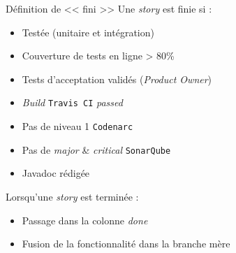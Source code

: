 \begin{frame}{Définition de << fini >>}
	Une \textit{story} est finie si : 
	\vspace{-10px}
	\begin{itemize}
		\item Testée (unitaire et intégration)
		\item Couverture de tests en ligne > 80\%
		\item Tests d'acceptation validés (\textit{Product Owner})
		\item \textit{Build} \texttt{Travis CI} \textit{passed}
		\item Pas de niveau 1 \texttt{Codenarc}
		\item Pas de \textit{major} \& \textit{critical} \texttt{SonarQube}
		\item Javadoc rédigée
	\end{itemize}
	\vfill
	\pause
	Lorsqu'une \textit{story} est terminée : 
	\vspace{-10px}
	\begin{itemize}
		\item Passage dans la colonne \textit{done}
		\item Fusion de la fonctionnalité dans la branche mère
	\end{itemize}





\end{frame}
